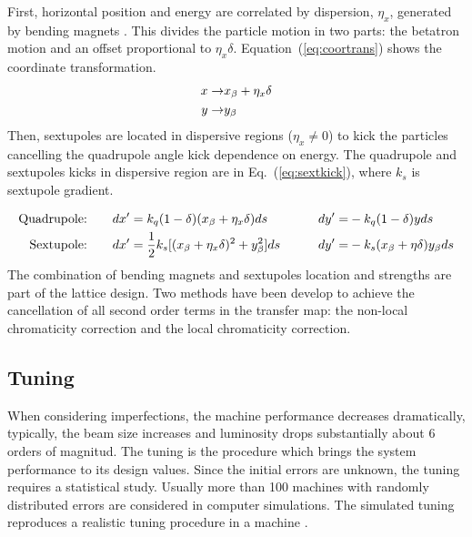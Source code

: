 First, horizontal position and energy are correlated by dispersion, $\eta_x$, generated by bending magnets \cite{CAS9104}. This divides the particle motion in two parts: the betatron motion and an offset proportional to $\eta_x\delta$. Equation~(\ref{eq:coortrans}) shows the coordinate transformation.
\begin{align}
 x\rightarrow& x_\beta + \eta_x \delta\label{eq:coortrans}\\
 y\rightarrow& y_\beta\notag
\end{align}
Then, sextupoles are located in dispersive regions ($\eta_x\neq0$) to kick the particles cancelling the quadrupole angle kick dependence on energy. The quadrupole and sextupoles kicks in dispersive region are in Eq.~(\ref{eq:sextkick}), where $k_s$ is sextupole gradient.\par
\begin{align}
 \text{Quadrupole:}&\qquad dx'=k_q(1-\delta)(x_\beta+\eta_x\delta)ds\qquad& dy'=&-k_q(1-\delta)yds \label{eq:sextkick}\\
 \text{Sextupole:}&\qquad dx'=\frac{1}{2}k_s[(x_\beta+\eta_x\delta)^2+y_\beta^2]ds\qquad& dy'=&-k_s(x_\beta+\eta\delta)y_\beta ds\notag
\end{align}
The combination of bending magnets and sextupoles location and strengths are part of the lattice design. Two methods have been develop to achieve the cancellation of all second order terms in the transfer map: the non-local chromaticity correction and the local chromaticity correction.\par


\subsection{Tuning}
When considering imperfections, the machine performance decreases dramatically, typically, the beam size increases and luminosity drops substantially about 6 orders of magnitud. The tuning is the procedure which brings the system performance to its design values. Since the initial errors are unknown, the tuning requires a statistical study. Usually more than 100 machines with randomly distributed errors are considered in computer simulations. The simulated tuning reproduces a realistic tuning procedure in a machine \cite{GarciaMorales:1982827,Minty:629879}.\par
